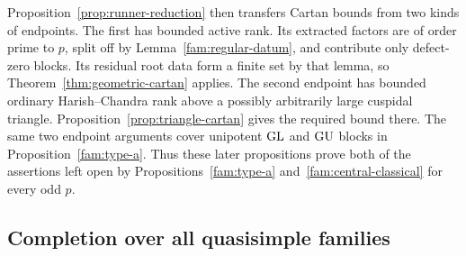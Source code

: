 Proposition~\ref{prop:runner-reduction} then transfers Cartan
bounds from two kinds of endpoints.  The first has bounded
active rank.  Its extracted factors are of order prime to
\(p\), split off by Lemma~\ref{fam:regular-datum}, and contribute
only defect-zero blocks.  Its residual root data form a finite
set by that lemma, so Theorem~\ref{thm:geometric-cartan} applies.
The second endpoint has bounded ordinary Harish--Chandra rank
above a possibly arbitrarily large cuspidal triangle.
Proposition~\ref{prop:triangle-cartan} gives the required bound
there.  The same two endpoint arguments cover unipotent
\(\operatorname{GL}\) and \(\operatorname{GU}\) blocks in
Proposition~\ref{fam:type-a}.  Thus these later propositions
prove both of the assertions left open by
Propositions~\ref{fam:type-a} and~\ref{fam:central-classical}
for every odd \(p\).

\subsection{Completion over all quasisimple families}

